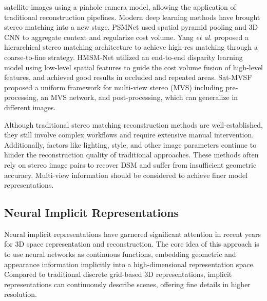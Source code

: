 satellite images using a pinhole camera model, allowing the application of traditional reconstruction pipelines. Modern deep learning methods have brought stereo matching into a new stage. PSMNet\cite{chang2018pyramid} used spatial pyramid pooling and 3D CNN to aggregate context and regularize cost volume. Yang \textit{et al.}\cite{yang2019hsm} proposed a hierarchical stereo matching architecture to achieve high-res matching through a coarse-to-fine strategy. HMSM-Net\cite{he2022hmsmnet} utilized an end-to-end disparity learning model using low-level spatial features to guide the cost volume fusion of high-level features, and achieved good results in occluded and repeated areas. Sat-MVSF\cite{gao2023general} proposed a uniform framework for multi-view stereo (MVS) including pre-processing, an MVS network, and post-processing, which can generalize in different images.

Although traditional stereo matching reconstruction methods are well-established, they still involve complex workflows and require extensive manual intervention. Additionally, factors like lighting, style, and other image parameters continue to hinder the reconstruction quality of traditional approaches. These methods often rely on stereo image pairs to recover DSM and suffer from insufficient geometric accuracy. Multi-view information should be considered to achieve finer model representations.

\subsection{Neural Implicit Representations}
Neural implicit representations have garnered significant attention in recent years for 3D space representation and reconstruction\cite{mildenhall2021nerf}. The core idea of this approach is to use neural networks as continuous functions, embedding geometric and appearance information implicitly into a high-dimensional representation space. Compared to traditional discrete grid-based 3D representations, implicit representations can continuously describe scenes, offering fine details in higher resolution.

